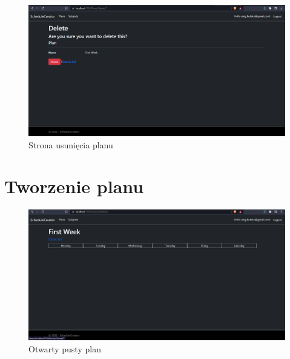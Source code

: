 \documentclass[a4paper,12pt,oneside]{book} %
\begin{document}
\begin{figure}[h]
    \centering\includegraphics[width=14cm]{15.png}
    \caption{Strona usunięcia planu}
\end{figure}

\chapter*{Tworzenie planu}

\begin{figure}[h]
    \centering\includegraphics[width=14cm]{17.png}
    \caption{Otwarty pusty plan}
\end{figure}
\end{document}
